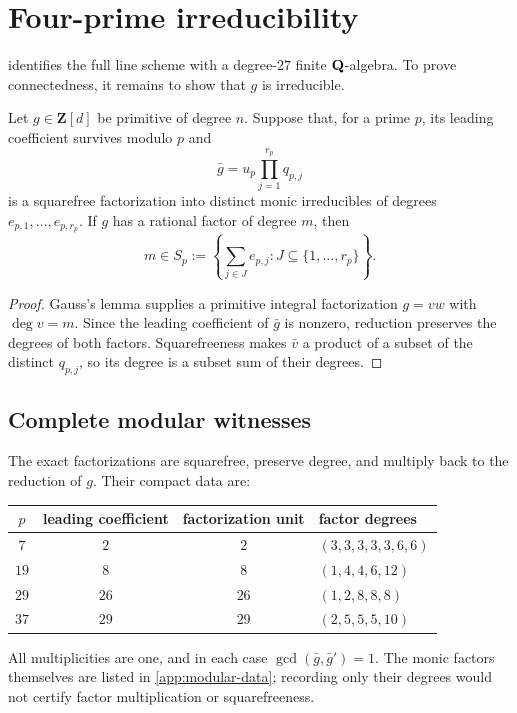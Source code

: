 \section{Four-prime irreducibility}
\label{sec:irreducibility}

 identifies the full line scheme with a
degree-\(27\) finite \(\mathbf Q\)-algebra.  To prove connectedness, it remains to
show that \(g\) is irreducible.

\begin{lemma}
\label{lem:subset-sum}
Let \(g\in\mathbf Z[d]\) be primitive of degree \(n\).  Suppose that, for a
prime \(p\), its leading coefficient survives modulo \(p\) and
\[
 \bar g=u_p\prod_{j=1}^{r_p}q_{p,j}
\]
is a squarefree factorization into distinct monic irreducibles of degrees
\(e_{p,1},\ldots,e_{p,r_p}\).  If \(g\) has a rational factor of degree
\(m\), then
\[
 m\in S_p:=
 \left\{\sum_{j\in J}e_{p,j}:
 J\subseteq\{1,\ldots,r_p\}\right\}.
\]
\end{lemma}

\begin{proof}
Gauss's lemma supplies a primitive integral factorization \(g=vw\) with
\(\deg v=m\).  Since the leading coefficient of \(\bar g\) is nonzero,
reduction preserves the degrees of both factors.  Squarefreeness makes
\(\bar v\) a product of a subset of the distinct \(q_{p,j}\), so its degree
is a subset sum of their degrees.
\end{proof}

\subsection{Complete modular witnesses}

The exact factorizations are squarefree, preserve degree, and multiply back
to the reduction of \(g\).  Their compact data are:
\begin{center}
\begin{tabular}{@{}cccl@{}}
\toprule
\(p\)& leading coefficient & factorization unit & factor degrees\\
\midrule
\(7\)&\(2\)&\(2\)&\((3,3,3,3,3,6,6)\)\\
\(19\)&\(8\)&\(8\)&\((1,4,4,6,12)\)\\
\(29\)&\(26\)&\(26\)&\((1,2,8,8,8)\)\\
\(37\)&\(29\)&\(29\)&\((2,5,5,5,10)\)\\
\bottomrule
\end{tabular}
\end{center}
All multiplicities are one, and in each case
\(\gcd(\bar g,\bar g')=1\).  The monic factors themselves are listed in
\cref{app:modular-data}; recording only their degrees would not certify
factor multiplication or squarefreeness.

